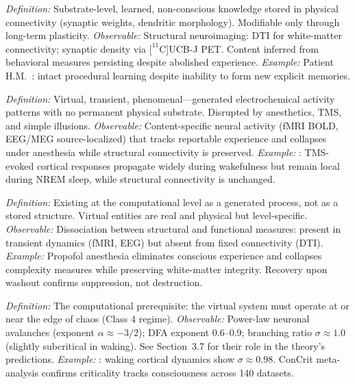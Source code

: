 \documentclass[12pt]{article}
\begin{document}
\begin{description}[leftmargin=0pt,labelindent=0pt,itemsep=0.8em]
\item[\textsc{Implicit model} (IWM/ISM)] \emph{Definition:} Substrate-level, learned, non-conscious knowledge stored in physical connectivity (synaptic weights, dendritic morphology). Modifiable only through long-term plasticity. \emph{Observable:} Structural neuroimaging: DTI for white-matter connectivity; synaptic density via $[^{11}$C]UCB-J PET. Content inferred from behavioral measures persisting despite abolished experience. \emph{Example:} Patient H.M.\ \citep{ScovilleMilner1957,Milner1962}: intact procedural learning despite inability to form new explicit memories.

\item[\textsc{Explicit model} (EWM/ESM)] \emph{Definition:} Virtual, transient, phenomenal---generated electrochemical activity patterns with no permanent physical substrate. Disrupted by anesthetics, TMS, and simple illusions. \emph{Observable:} Content-specific neural activity (fMRI BOLD, EEG/MEG source-localized) that tracks reportable experience and collapses under anesthesia while structural connectivity is preserved. \emph{Example:} \citet{Massimini2005}: TMS-evoked cortical responses propagate widely during wakefulness but remain local during NREM sleep, while structural connectivity is unchanged.

\item[\textsc{Virtual} (as in FMT)] \emph{Definition:} Existing at the computational level as a generated process, not as a stored structure. Virtual entities are real and physical but level-specific. \emph{Observable:} Dissociation between structural and functional measures: present in transient dynamics (fMRI, EEG) but absent from fixed connectivity (DTI). \emph{Example:} Propofol anesthesia eliminates conscious experience and collapses complexity measures \citep{Casali2013} while preserving white-matter integrity. Recovery upon washout confirms suppression, not destruction.

\item[\textsc{Criticality}] \emph{Definition:} The computational prerequisite: the virtual system must operate at or near the edge of chaos (Class 4 regime). \emph{Observable:} Power-law neuronal avalanches (exponent $\alpha \approx -3/2$); DFA exponent 0.6--0.9; branching ratio $\sigma \approx 1.0$ (slightly subcritical in waking). See Section~3.7 for their role in the theory's predictions. \emph{Example:} \citet{Priesemann2014}: waking cortical dynamics show $\sigma \approx 0.98$. ConCrit meta-analysis \citep{AlgomShriki2026} confirms criticality tracks consciousness across 140 datasets.


\end{description}
\end{document}
